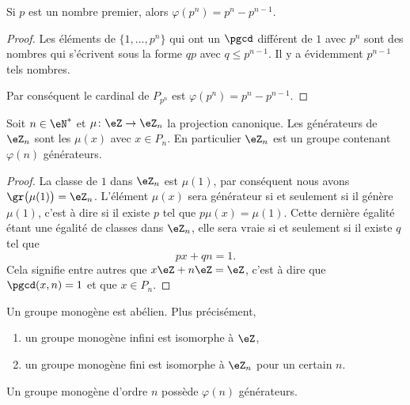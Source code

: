 \begin{lemma}
    Si \( p\) est un nombre premier, alors \( \varphi(p^n)=p^n-p^{n-1}\).
\end{lemma}

\begin{proof}
    Les éléments de \( \{ 1,\ldots,p^n \}\) qui ont un \( \pgcd\) différent de \( 1\) avec \( p^n\) sont des nombres qui s'écrivent sous la forme \( qp\) avec \( q\leq p^{n-1}\). Il y a évidemment \( p^{n-1}\) tels nombres.

    Par conséquent le cardinal de \( P_{p^n}\) est \( \varphi(p^{n})=p^n-p^{n-1}\).
\end{proof}

\begin{proposition}     \label{PropZnmuphiGensn}
    Soit \( n\in\eN^*\) et \( \mu\colon \eZ\to \eZ_n\) la projection canonique. Les générateurs de \( \eZ_n\) sont les \( \mu(x)\) avec \( x\in P_n\). En particulier \( \eZ_n\) est un groupe contenant \( \varphi(n)\) générateurs.
\end{proposition}

\begin{proof}
    La classe de \( 1\) dans \( \eZ_n\) est \( \mu(1)\), par conséquent nous avons \( \gr\big( \mu(1) \big)=\eZ_n\). L'élément \( \mu(x)\) sera générateur si et seulement si il génère \( \mu(1)\), c'est à dire si il existe \( p\) tel que \( p\mu(x)=\mu(1)\). Cette dernière égalité étant une égalité de classes dans \( \eZ_n\), elle sera vraie si et seulement si il existe \( q\) tel que
    \begin{equation}
        px+qn=1.
    \end{equation}
    Cela signifie entre autres que \( x\eZ+n\eZ=\eZ\), c'est à dire que \( \pgcd(x,n)=1\) et que \( x\in P_n\).
\end{proof}


\begin{theorem}
    Un groupe monogène est abélien. Plus précisément,
    \begin{enumerate}
        \item
            un groupe monogène infini est isomorphe à \( \eZ\),
        \item
            un groupe monogène fini est isomorphe à \( \eZ_n\) pour un certain \( n\).
    \end{enumerate}
    Un groupe monogène d'ordre \( n\) possède \( \varphi(n)\) générateurs.
\end{theorem}

